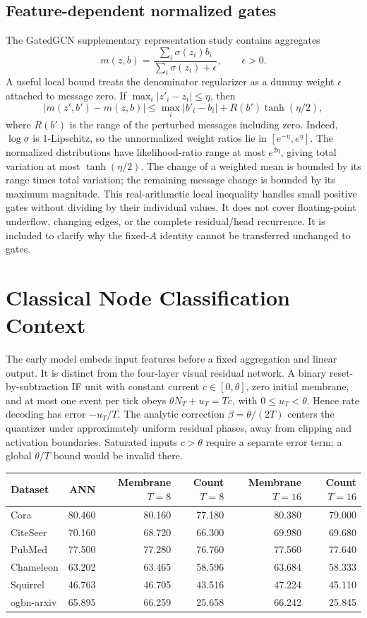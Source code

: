 \documentclass[10pt,twocolumn,letterpaper]{article}
\begin{document}
\subsection{Feature-dependent normalized gates}
The GatedGCN supplementary representation study contains aggregates
\[
 m(z,b)=\frac{\sum_i\sigma(z_i)b_i}{\sum_i\sigma(z_i)+\epsilon},\qquad \epsilon>0.
\]
A useful local bound treats the denominator regularizer as a dummy weight $\epsilon$ attached to message zero. If $\max_i|z'_i-z_i|\leq\eta$, then
\[
 |m(z',b')-m(z,b)|\leq\max_i|b'_i-b_i|+R(b')\tanh(\eta/2),
\]
where $R(b')$ is the range of the perturbed messages including zero. Indeed, $\log\sigma$ is 1-Lipschitz, so the unnormalized weight ratios lie in $[e^{-\eta},e^{\eta}]$. The normalized distributions have likelihood-ratio range at most $e^{2\eta}$, giving total variation at most $\tanh(\eta/2)$. The change of a weighted mean is bounded by its range times total variation; the remaining message change is bounded by its maximum magnitude. This real-arithmetic local inequality handles small positive gates without dividing by their individual values. It does not cover floating-point underflow, changing edges, or the complete residual/head recurrence. It is included to clarify why the fixed-$A$ identity cannot be transferred unchanged to gates.

\section{Classical Node Classification Context}
The early model embeds input features before a fixed aggregation and linear output. It is distinct from the four-layer visual residual network. A binary reset-by-subtraction IF unit with constant current $c\in[0,\theta]$, zero initial membrane, and at most one event per tick obeys $\theta N_T+u_T=Tc$, with $0\leq u_T<\theta$. Hence rate decoding has error $-u_T/T$. The analytic correction $\beta=\theta/(2T)$ centers the quantizer under approximately uniform residual phases, away from clipping and activation boundaries. Saturated inputs $c>\theta$ require a separate error term; a global $\theta/T$ bound would be invalid there.



\begin{table}[t]\centering\small

\label{tab:nodes}
\begin{tabular}{lrrrrr}\toprule
Dataset & ANN & Membrane $T=8$ & Count $T=8$ & Membrane $T=16$ & Count $T=16$\\\midrule
Cora &80.460&80.160&77.180&80.380&79.000\\
CiteSeer &70.160&68.720&66.300&69.980&69.680\\
PubMed &77.500&77.280&76.760&77.560&77.640\\
Chameleon &63.202&63.465&58.596&63.684&58.333\\
Squirrel &46.763&46.705&43.516&47.224&45.110\\
ogbn-arxiv &65.895&66.259&25.658&66.242&25.845\\\bottomrule
\end{tabular}\end{table}
\end{document}
